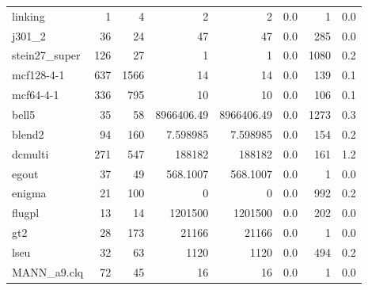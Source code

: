 \documentclass[leqno]{article}
\begin{document}
\begin{center}
\setlength{\tabcolsep}{2pt}
\newcommand{\g}{\raisebox{0.25ex}{\tiny $>$}}
\tablelasttail{\bottomrule}
\begin{supertabular*}{\textwidth}{@{\extracolsep{\fill}}lrrrrrrr@{}}
linking            &      1 &      4 &                2 &                2 &    0.0 &         1 &      0.0\\
j301\_2            &     36 &     24 &               47 &               47 &    0.0 &       285 &      0.0\\
stein27\_super     &    126 &     27 &                1 &                1 &    0.0 &      1080 &      0.2\\
mcf128-4-1         &    637 &   1566 &               14 &               14 &    0.0 &       139 &      0.1\\
mcf64-4-1          &    336 &    795 &               10 &               10 &    0.0 &       106 &      0.1\\
bell5              &     35 &     58 &       8966406.49 &       8966406.49 &    0.0 &      1273 &      0.3\\
blend2             &     94 &    160 &         7.598985 &         7.598985 &    0.0 &       154 &      0.2\\
dcmulti            &    271 &    547 &           188182 &           188182 &    0.0 &       161 &      1.2\\
egout              &     37 &     49 &         568.1007 &         568.1007 &    0.0 &         1 &      0.0\\
enigma             &     21 &    100 &                0 &                0 &    0.0 &       992 &      0.2\\
flugpl             &     13 &     14 &          1201500 &          1201500 &    0.0 &       202 &      0.0\\
gt2                &     28 &    173 &            21166 &            21166 &    0.0 &         1 &      0.0\\
lseu               &     32 &     63 &             1120 &             1120 &    0.0 &       494 &      0.2\\
MANN\_a9.clq       &     72 &     45 &               16 &               16 &    0.0 &         1 &      0.0\\

\end{supertabular*}
\end{center}
\end{document}
